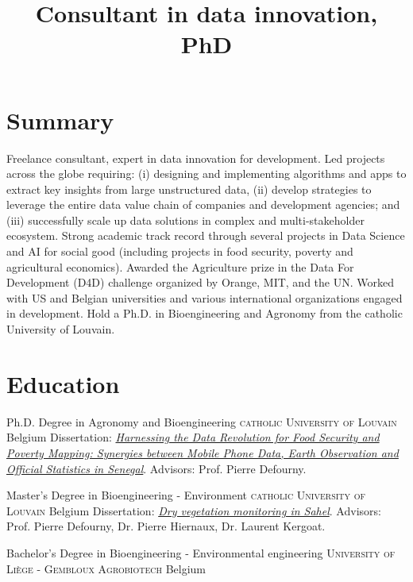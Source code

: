 \documentclass[11pt,a4paper,sans]{moderncv} %
\title{Consultant in data innovation, PhD}
\begin{document}
\makecvtitle %


\vspace{-1mm}
\section{Summary}

Freelance consultant, expert in data innovation for development. Led projects across the globe requiring: (i) designing and implementing algorithms and apps to extract key insights from large unstructured data, (ii) develop strategies to leverage the entire data value chain of companies and development agencies; and (iii) successfully scale up data solutions in complex and multi-stakeholder ecosystem. Strong academic track record through several projects in Data Science and AI for social good (including projects in food security, poverty and agricultural economics). Awarded the Agriculture prize in the Data For Development (D4D) challenge organized by Orange, MIT, and the UN. Worked with US and Belgian universities and various international organizations engaged in development. Hold a Ph.D. in Bioengineering and Agronomy from the catholic University of Louvain.

\section{Education}

    {Ph.D. Degree in Agronomy and Bioengineering}
    {\textsc{catholic University of Louvain}}
    {Belgium}{}
    {Dissertation:  \emph{\href{https://bit.ly/2BYyEF3}{Harnessing the Data Revolution for Food Security and Poverty Mapping: Synergies between Mobile Phone Data, Earth Observation and Official Statistics in Senegal}}. Advisors: Prof. Pierre Defourny.}
    
    
    {Master's Degree in Bioengineering - Environment}
    {\textsc{catholic University of Louvain}}
    {Belgium}{}
    {Dissertation: \emph{\href{http://bit.ly/1U7Bi9V}{Dry vegetation monitoring in Sahel}}.  Advisors: Prof.  Pierre Defourny, Dr. Pierre Hiernaux, Dr. Laurent Kergoat.}
    

        
  {Bachelor's Degree in Bioengineering - Environmental engineering}
    {\textsc{University of Liège - Gembloux Agrobiotech}}
    {Belgium}{}
    {}  
    
\end{document}

